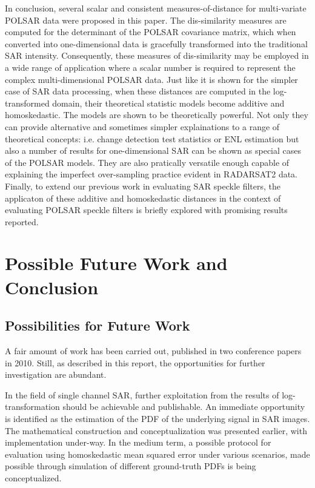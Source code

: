 In conclusion, several scalar and consistent measures-of-distance for multi-variate POLSAR data were proposed in this paper.
The dis-similarity measures are computed for the determinant of the POLSAR covariance matrix,
  which when converted into one-dimensional data
  is gracefully transformed into the traditional SAR intensity.
Consequently, these measures of dis-similarity may be employed in a wide range of application
  where a scalar number is required to represent the complex multi-dimensional POLSAR data.
Just like it is shown for the simpler case of SAR data processing\cite{Le_2010_ACRS},
  when these distances are computed in the log-transformed domain,
  their theoretical statistic models become additive and homoskedastic.
The models are shown to be theoretically powerful.
Not only they can provide alternative and sometimes simpler explainations to a range of theoretical concepts:
  i.e. change detection test statistics or ENL estimation
but also a number of results for one-dimensional SAR can be shown as special cases of the POLSAR models.
They are also pratically versatile enough
  capable of explaining the imperfect over-sampling practice evident in RADARSAT2 data.
Finally, to extend our previous work in evaluating SAR speckle filters,
  the applicaton of these additive and homoskedastic distances in the context of evaluating POLSAR speckle filters is briefly explored
  with promising results reported.
        
\section{Possible Future Work and Conclusion}

\subsection{Possibilities for Future Work}

A fair amount of work has been carried out, published in two conference papers in 2010.
Still, as described in this report, the opportunities for further investigation are abundant. 

In the field of single channel SAR, further exploitation from the results of log-transformation should be achievable and publishable.
An immediate opportunity is identified as the estimation of the PDF of the underlying signal in SAR images. 
The mathematical construction and conceptualization was presented earlier, with implementation under-way.
In the medium term, a possible protocol for evaluation using homoskedastic mean squared error under various scenarios, made possible through simulation of different ground-truth PDFs is being conceptualized.

